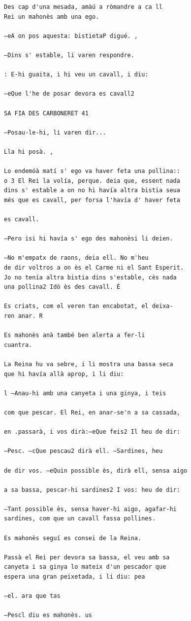 \documentclass[
  letterpaper,
  DIV=11,
  numbers=noendperiod]{scrreprt}
\begin{document}
\begin{verbatim}
Des cap d'una mesada, amàú a ròmandre a ca ll
Rei un mahonès amb una ego.

—eA on pos aquesta: bistietaP digué. ,

—Dins s' estable, li varen respondre.

: E-hi guaita, i hi veu un cavall, i diu:

—eQue l'he de posar devora es cavall2

SA FIA DES CARBONERET 41

—Posau-le-hi, li varen dir...

Lla hi posà. ,

Lo endemóà matí s' ego va haver feta una pollina::
o 3 El Rei la volía, perque. deia que, essent nada
dins s' estable a on no hi havía altra bistia seua
més que es cavall, per forsa l'havía d' haver feta

es cavall.

—Pero isi hi havía s' ego des mahonèsi li deien.

—No m'empatx de raons, deia ell. No m'heu
de dir voltros a on ès el Carme ni el Sant Esperit.
Jo no tenía altra bistia dins s'estable, cès nada
una pollina2 Idò ès des cavall. É

Es criats, com el veren tan encabotat, el deixa-
ren anar. R

Es mahonès anà també ben alerta a fer-li
cuantra.

La Reina hu va sebre, i li mostra una bassa seca
que hi havía allà aprop, i li diu:

l —Anau-hi amb una canyeta i una ginya, i teis

com que pescar. El Rei, en anar-se'n a sa cassada,

en .passarà, i vos dirà:—eQue feis2 Il heu de dir:

—Pesc. —cQue pescau2 dirà ell. —Sardines, heu

de dir vos. —eQuin possible ès, dirà ell, sensa aigo

a sa bassa, pescar-hi sardines2 I vos: heu de dir:

—Tant possible ès, sensa haver-hi aigo, agafar-hi
sardines, com que un cavall fassa pollines.

Es mahonès seguí es consei de la Reina.

Passà el Rei per devora sa bassa, el veu amb sa
canyeta i sa ginya lo mateix d'un pescador que
espera una gran peixetada, i li diu: pea

—el. ara que tas

—Pescl diu es mahonès. us


\end{verbatim}
\end{document}

